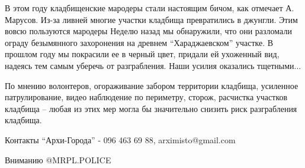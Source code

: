 В этом году кладбищенские мародеры стали настоящим бичом, как отмечает
А. Марусов. Из-за ливней многие участки кладбища превратились в джунгли. Этим
вовсю пользуются мародеры Неделю назад мы обнаружили, что они разломали ограду
безымянного захоронения на древнем \enquote{Хараджаевском} участке. В прошлом году мы
покрасили ее в черный цвет, придали ей ухоженный вид, надеясь тем самым уберечь
от разграбления. Наши усилия оказались тщетными... 

По мнению волонтеров, огораживание забором территории кладбища, усиленное
патрулирование, видео наблюдение по периметру, сторож, расчистка участков
кладбища – любая из этих мер могла бы значительно снизить риск разграбления
кладбища.

Контакты \enquote{Архи-Города} - 096 463 69 88, arximisto@gmail.com

Вниманию @MRPL.POLICE
